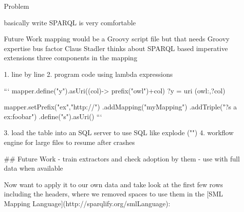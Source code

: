 \documentclass{beamer}
\begin{document}
\begin{frame}{Problem}
\begin{frame}{}
\begin{frame}{}
basically write SPARQL is very comfortable

\begin{frame}{}
Future Work
mapping would be a Groovy script file
but that needs Groovy expertise
bus factor
Claus Stadler thinks about SPARQL based imperative extensions
three components in the mapping

1. line by line
2. program code
using lambda expressions

```
mapper.define("y").asUri((col)-> prefix("owl")+col)
?y = uri (owl:,?col)

mapper.setPrefix("ex","http://")
.addMapping("myMapping")
.addTriple("?s a ex:foobar")
.define("s").asUri()
```

3. load the table into an SQL server to use SQL like explode ("")
4. workflow engine for large files to resume after crashes

## Future Work
- train extractors and check adoption by them
- use with full data when available



Now want to apply it to our own data and take look at the first few rows including the headers, where we removed spaces to use them in the [SML Mapping Language](http://sparqlify.org/smlLanguage):


\end{frame}
\end{frame}
\end{frame}
\end{frame}
\end{document}
